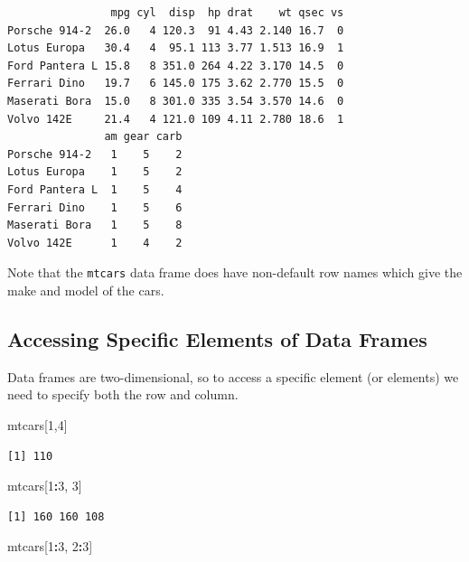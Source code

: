 \documentclass[
]{krantz}
\makeatletter
\newenvironment{Shaded}{\begin{snugshade}}{\end{snugshade}}
\newcommand{\DecValTok}[1]{\textcolor[rgb]{0.06,0.06,0.06}{#1}}
\newcommand{\NormalTok}[1]{#1}
\newcommand{\OperatorTok}[1]{\textcolor[rgb]{0.43,0.43,0.43}{\textbf{#1}}}
\newenvironment{kframe}{%
\medskip{}
\setlength{\fboxsep}{.8em}
 \def\at@end@of@kframe{}%
 \ifinner\ifhmode%
  \def\at@end@of@kframe{\end{minipage}}%
  \begin{minipage}{\columnwidth}%
 \fi\fi%
 \def\FrameCommand##1{\hskip\@totalleftmargin \hskip-\fboxsep
 \colorbox{shadecolor}{##1}\hskip-\fboxsep
     \hskip-\linewidth \hskip-\@totalleftmargin \hskip\columnwidth}%
 \MakeFramed {\advance\hsize-\width
   \@totalleftmargin\z@ \linewidth\hsize
   \@setminipage}}%
 {\par\unskip\endMakeFramed%
 \at@end@of@kframe}
\renewenvironment{Shaded}{\begin{kframe}}{\end{kframe}}
\makeatother
\begin{document}
\begin{verbatim}
                mpg cyl  disp  hp drat    wt qsec vs
Porsche 914-2  26.0   4 120.3  91 4.43 2.140 16.7  0
Lotus Europa   30.4   4  95.1 113 3.77 1.513 16.9  1
Ford Pantera L 15.8   8 351.0 264 4.22 3.170 14.5  0
Ferrari Dino   19.7   6 145.0 175 3.62 2.770 15.5  0
Maserati Bora  15.0   8 301.0 335 3.54 3.570 14.6  0
Volvo 142E     21.4   4 121.0 109 4.11 2.780 18.6  1
               am gear carb
Porsche 914-2   1    5    2
Lotus Europa    1    5    2
Ford Pantera L  1    5    4
Ferrari Dino    1    5    6
Maserati Bora   1    5    8
Volvo 142E      1    4    2
\end{verbatim}

Note that the \texttt{mtcars} data frame does have non-default row names which give the make and model of the cars.

\hypertarget{accessing-specific-elements-of-data-frames}{%
\subsection{Accessing Specific Elements of Data Frames}\label{accessing-specific-elements-of-data-frames}}

Data frames are two-dimensional, so to access a specific element (or elements) we need to specify both the row and column.

\begin{Shaded}
\begin{Highlighting}[]
\NormalTok{mtcars[}\DecValTok{1}\NormalTok{,}\DecValTok{4}\NormalTok{]}
\end{Highlighting}
\end{Shaded}

\begin{verbatim}
[1] 110
\end{verbatim}

\begin{Shaded}
\begin{Highlighting}[]
\NormalTok{mtcars[}\DecValTok{1}\OperatorTok{:}\DecValTok{3}\NormalTok{, }\DecValTok{3}\NormalTok{]}
\end{Highlighting}
\end{Shaded}

\begin{verbatim}
[1] 160 160 108
\end{verbatim}

\begin{Shaded}
\begin{Highlighting}[]
\NormalTok{mtcars[}\DecValTok{1}\OperatorTok{:}\DecValTok{3}\NormalTok{, }\DecValTok{2}\OperatorTok{:}\DecValTok{3}\NormalTok{]}
\end{Highlighting}
\end{Shaded}
\end{document}
